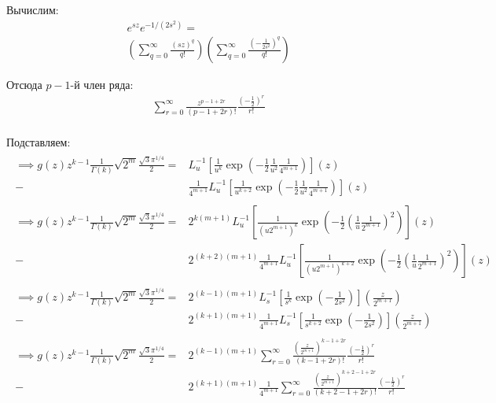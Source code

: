 \documentclass[a4paper, fleqn]{report}
\begin{document}
Вычислим:
\begin{align*}
    & e^{sz} e^{-1 / (2s^2)} = \\
    & \left( \sum_{q=0}^{\infty} \frac{\left( sz \right)^q }{q!} \right)
      \left( \sum_{q=0}^{\infty} \frac{\left(-\frac{1}{2s^2}\right)^q}{q!} \right) 
\end{align*}

Отсюда $p-1$-й член ряда:
\begin{align*}
    & \sum_{r=0}^{\infty} \frac{z^{p-1+2r}}{\left( p-1+2r \right)!} \frac{\left( -\frac{1}{2} \right)^r}{r!} \\
\end{align*}

Подставляем:
\begin{align*}
\begin{split}
    \implies g(z) z^{k-1} \frac{1}{\Gamma(k)} \sqrt{2^m} \frac{\sqrt{3} \pi^{1 /4}}{2}  =
        {}& L^{-1}_u \left[ \frac{1}{u^k} \exp \left( -\frac{1}{2} \frac{1}{u^2} \frac{1}{4^{m+1}} \right) \right](z) \\
       -{}& \frac{1}{4^{m+1}} L^{-1}_u \left[ \frac{1}{u^{k+2}} \exp \left( -\frac{1}{2} \frac{1}{u^2} \frac{1}{4^{m+1}} \right) \right](z) 
\end{split} \\
\begin{split}
    \implies g(z) z^{k-1} \frac{1}{\Gamma(k)} \sqrt{2^m} \frac{\sqrt{3} \pi^{1 /4}}{2}  =
        {}& 2^{k(m+1)} L^{-1}_u \left[ \frac{1}{\left(u 2^{m+1}\right)^k} \exp \left( -\frac{1}{2} \left(\frac{1}{u} \frac{1}{2^{m+1}}\right)^2 \right) \right](z) \\
       -{}& 2^{(k+2)(m+1)} \frac{1}{4^{m+1}} L^{-1}_u \left[ \frac{1}{\left(u 2^{m+1}\right)^{k+2}} \exp \left( -\frac{1}{2} \left(\frac{1}{u} \frac{1}{2^{m+1}}\right)^2 \right) \right](z) 
\end{split} \\
\begin{split}
    \implies g(z) z^{k-1} \frac{1}{\Gamma(k)} \sqrt{2^m} \frac{\sqrt{3} \pi^{1 /4}}{2}  =
        {}& 2^{(k-1)(m+1)} L^{-1}_{s} \left[ \frac{1}{s^k} \exp \left( -\frac{1}{2s^2} \right) \right]\left(\frac{z}{2^{m+1}}\right) \\
       -{}& 2^{(k+1)(m+1)} \frac{1}{4^{m+1}} L^{-1}_s \left[ \frac{1}{s^{k+2}} \exp \left( -\frac{1}{2s^2}\right) \right]\left(\frac{z}{2^{m+1}}\right) 
\end{split} \\
\begin{split}
    \implies g(z) z^{k-1} \frac{1}{\Gamma(k)} \sqrt{2^m} \frac{\sqrt{3} \pi^{1 /4}}{2}  =
        {}& 2^{(k-1)(m+1)} \sum_{r=0}^{\infty} \frac{\left(\frac{z}{2^{m+1}}\right)^{k-1+2r}}{(k-1+2r)!} \frac{\left( -\frac{1}{2} \right)^r }{r!} \\
       -{}& 2^{(k+1)(m+1)} \frac{1}{4^{m+1}} \sum_{r=0}^{\infty} \frac{\left(\frac{z}{2^{m+1}}\right)^{k+2-1+2r}}{(k+2-1+2r)!} \frac{\left( -\frac{1}{2} \right)^r }{r!} 
\end{split}
\end{align*}
\end{document}
